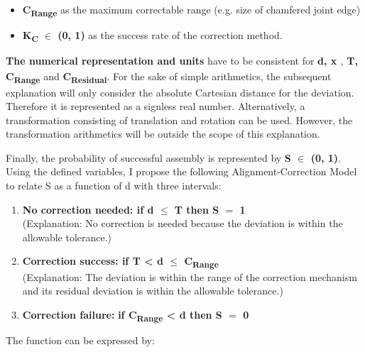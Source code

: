 \documentclass[11pt]{book}
\begin{document}
\begin{itemize}
	\item \textbf{C\textsubscript{Range}} as the maximum correctable range (e.g. size of chamfered joint edge)

	\item \textbf{K\textsubscript{C}} \textbf{$\in$ (0, 1) }as the success rate of the correction method. 

\end{itemize}
\textbf{The numerical representation and units }have to be consistent for \textbf{d, x\textsubscript{ }}, \textbf{T, C\textsubscript{Range}} and \textbf{C\textsubscript{Residual}}. For the sake of simple arithmetics, the subsequent explanation will only consider the absolute Cartesian distance for the deviation. Therefore it is represented as a signless real number. Alternatively, a transformation consisting of translation and rotation can be used. However, the transformation arithmetics will be outside the scope of this explanation. 

Finally, the probability of successful assembly is represented by \textbf{S $\in$ (0, 1)}. Using the defined variables, I propose the following Alignment-Correction Model to relate S as a function of d with three intervals: 

\begin{enumerate}
	\item \textbf{No correction needed: if d $\leq$ T then S $=$ 1 \\ }(Explanation: No correction is needed because the deviation is within the allowable tolerance.)

	\item \textbf{Correction success: if T < d $\leq$ C\textsubscript{Range}} \\ (Explanation: The deviation is within the range of the correction mechanism and its residual deviation is within the allowable tolerance.)

	\item \textbf{Correction failure:} \textbf{if C\textsubscript{Range} < d then S $=$ 0}

\end{enumerate}
The function can be expressed by: 
\end{document}
